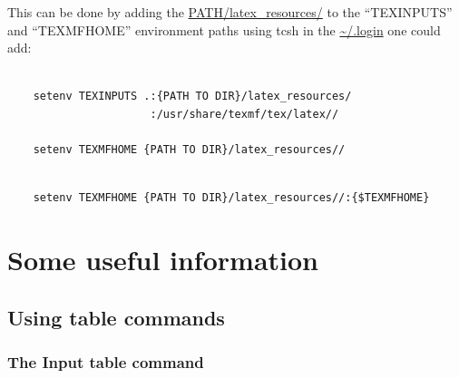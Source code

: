     \noindent This can be done by adding the \url{PATH/latex_resources/} to the ``TEXINPUTS'' and ``TEXMFHOME'' environment paths \ie using tcsh in the \url{~/.login} one could add:

    \begin{lstlisting}[style=base]

    setenv TEXINPUTS .:{PATH TO DIR}/latex_resources/
                      :/usr/share/texmf/tex/latex//

    setenv TEXMFHOME {PATH TO DIR}/latex_resources//

    \end{lstlisting} 

    \noindent {\bf \textcolor{red}{WARNING: If ``TEXINPUTS'' and ``TEXMFHOME'' exist before using the previous two commands will override your current paths. So please check the paths before replacing them (\ie using ``printenv TEXINPUTS'') and then if they exist using:}}

    \begin{lstlisting}[style=base]

    setenv TEXMFHOME {PATH TO DIR}/latex_resources//:{$TEXMFHOME}

    \end{lstlisting}




\section{Some useful information}
    \label{ch1_section_useful_information}



\subsection{Using table commands}
	\label{ch1_section_using_this}

    \subsubsection{The Input table command}
        \label{ch1_section_using_input_table_command}

